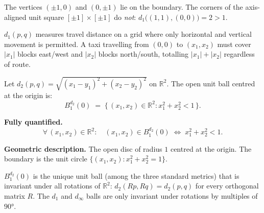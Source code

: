 \begin{remark*}
The vertices $(\pm 1,0)$ and $(0,\pm 1)$ lie on the boundary.
The corners of the axis-aligned unit square $[\pm1]\times[\pm1]$
do \emph{not}: $d_1\bigl((1,1),(0,0)\bigr) = 2 > 1$.
\end{remark*}

\begin{remark*}
$d_1(p,q)$ measures travel distance on a grid where only
horizontal and vertical movement is permitted.
A taxi travelling from $(0,0)$ to $(x_1,x_2)$ must cover
$|x_1|$ blocks east/west and $|x_2|$ blocks north/south,
totalling $|x_1|+|x_2|$ regardless of route.
\end{remark*}


\begin{tcolorbox}[colback=propbox, colframe=propborder, arc=2pt,
  left=6pt, right=6pt, top=4pt, bottom=4pt,
  title={\small\textbf{Unit Ball: Euclidean Metric $d_2$ on $\mathbb{R}^2$}},
  fonttitle=\small\bfseries]
\begin{definition}
\label{def:ball-d2}
Let $d_2(p,q) = \sqrt{(x_1-y_1)^2+(x_2-y_2)^2}$ on $\mathbb{R}^2$.
The open unit ball centred at the origin is:
\[
B_1^{d_2}(0)
\;=\; \bigl\{\,(x_1,x_2)\in\mathbb{R}^2 :
x_1^2 + x_2^2 < 1\,\bigr\}.
\]

\medskip
\noindent\textbf{Fully quantified.}
\[
\forall\,(x_1,x_2)\in\mathbb{R}^2:\quad
(x_1,x_2)\in B_1^{d_2}(0)
\;\iff\;
x_1^2 + x_2^2 < 1.
\]

\medskip
\noindent\textbf{Geometric description.}
The open disc of radius $1$ centred at the origin.
The boundary is the unit circle $\{(x_1,x_2): x_1^2+x_2^2=1\}$.
\end{definition}
\end{tcolorbox}

\begin{remark*}
$B_1^{d_2}(0)$ is the unique unit ball (among the three standard metrics)
that is invariant under all rotations of $\mathbb{R}^2$:
$d_2(Rp, Rq) = d_2(p,q)$ for every orthogonal matrix $R$.
The $d_1$ and $d_\infty$ balls are only invariant under rotations by
multiples of $90°$.
\end{remark*}


